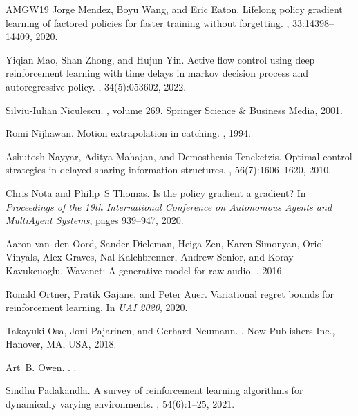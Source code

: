 \begin{thebibliography}{AMGW{\etalchar{+}}19}
Jorge Mendez, Boyu Wang, and Eric Eaton.
\newblock Lifelong policy gradient learning of factored policies for faster training without forgetting.
, 33:14398--14409, 2020.

Yiqian Mao, Shan Zhong, and Hujun Yin.
\newblock Active flow control using deep reinforcement learning with time delays in markov decision process and autoregressive policy.
, 34(5):053602, 2022.

Silviu-Iulian Niculescu.
, volume 269.
\newblock Springer Science \& Business Media, 2001.

Romi Nijhawan.
\newblock Motion extrapolation in catching.
, 1994.

Ashutosh Nayyar, Aditya Mahajan, and Demosthenis Teneketzis.
\newblock Optimal control strategies in delayed sharing information structures.
, 56(7):1606--1620, 2010.

Chris Nota and Philip~S Thomas.
\newblock Is the policy gradient a gradient?
\newblock In {\em Proceedings of the 19th International Conference on Autonomous Agents and MultiAgent Systems}, pages 939--947, 2020.

Aaron van~den Oord, Sander Dieleman, Heiga Zen, Karen Simonyan, Oriol Vinyals, Alex Graves, Nal Kalchbrenner, Andrew Senior, and Koray Kavukcuoglu.
\newblock Wavenet: A generative model for raw audio.
, 2016.

Ronald Ortner, Pratik Gajane, and Peter Auer.
\newblock Variational regret bounds for reinforcement learning.
\newblock In {\em UAI 2020}, 2020.

Takayuki Osa, Joni Pajarinen, and Gerhard Neumann.
.
\newblock Now Publishers Inc., Hanover, MA, USA, 2018.

Art~B. Owen.
.
.

Sindhu Padakandla.
\newblock A survey of reinforcement learning algorithms for dynamically varying environments.
, 54(6):1--25, 2021.


\end{thebibliography}
